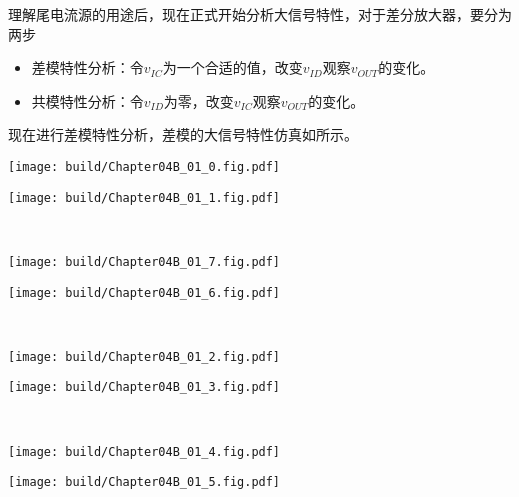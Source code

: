 理解尾电流源的用途后，现在正式开始分析大信号特性，对于差分放大器，要分为两步
\begin{itemize}
    \item 差模特性分析：令$v_{IC}$为一个合适的值，改变$v_{ID}$观察$v_{OUT}$的变化。
    \item 共模特性分析：令$v_{ID}$为零，改变$v_{IC}$观察$v_{OUT}$的变化。
\end{itemize}

现在进行差模特性分析，差模的大信号特性仿真如所示。

\begin{Figure}[电流镜负载的差分放大器的差模特性]
    \begin{FigureSub}
        \texttt{[image: build/Chapter04B\_01\_0.fig.pdf]}
    \end{FigureSub}
    \begin{FigureSub}
        \texttt{[image: build/Chapter04B\_01\_1.fig.pdf]}
    \end{FigureSub}\\ \vspace{0.75cm}
    \begin{FigureSub}
        \texttt{[image: build/Chapter04B\_01\_7.fig.pdf]}
    \end{FigureSub}
    \begin{FigureSub}
        \texttt{[image: build/Chapter04B\_01\_6.fig.pdf]}
    \end{FigureSub}\\ \vspace{0.75cm}
    \begin{FigureSub}
        \texttt{[image: build/Chapter04B\_01\_2.fig.pdf]}
    \end{FigureSub}
    \begin{FigureSub}
        \texttt{[image: build/Chapter04B\_01\_3.fig.pdf]}
    \end{FigureSub}\\ \vspace{0.75cm}
    \begin{FigureSub}
        \texttt{[image: build/Chapter04B\_01\_4.fig.pdf]}
    \end{FigureSub}
    \begin{FigureSub}
        \texttt{[image: build/Chapter04B\_01\_5.fig.pdf]}
    \end{FigureSub}
\end{Figure}

